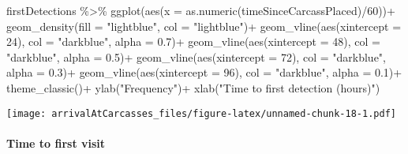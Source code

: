 \documentclass[
]{article}
\newenvironment{Shaded}{\begin{snugshade}}{\end{snugshade}}
\newcommand{\AttributeTok}[1]{\textcolor[rgb]{0.77,0.63,0.00}{#1}}
\newcommand{\DecValTok}[1]{\textcolor[rgb]{0.00,0.00,0.81}{#1}}
\newcommand{\FloatTok}[1]{\textcolor[rgb]{0.00,0.00,0.81}{#1}}
\newcommand{\FunctionTok}[1]{\textcolor[rgb]{0.00,0.00,0.00}{#1}}
\newcommand{\NormalTok}[1]{#1}
\newcommand{\SpecialCharTok}[1]{\textcolor[rgb]{0.00,0.00,0.00}{#1}}
\newcommand{\StringTok}[1]{\textcolor[rgb]{0.31,0.60,0.02}{#1}}
\begin{document}
\begin{Shaded}
\begin{Highlighting}[]
\NormalTok{firstDetections }\SpecialCharTok{\%\textgreater{}\%}
  \FunctionTok{ggplot}\NormalTok{(}\FunctionTok{aes}\NormalTok{(}\AttributeTok{x =} \FunctionTok{as.numeric}\NormalTok{(timeSinceCarcassPlaced)}\SpecialCharTok{/}\DecValTok{60}\NormalTok{))}\SpecialCharTok{+}
  \FunctionTok{geom\_density}\NormalTok{(}\AttributeTok{fill =} \StringTok{"lightblue"}\NormalTok{, }\AttributeTok{col =} \StringTok{"lightblue"}\NormalTok{)}\SpecialCharTok{+}
  \FunctionTok{geom\_vline}\NormalTok{(}\FunctionTok{aes}\NormalTok{(}\AttributeTok{xintercept =} \DecValTok{24}\NormalTok{), }\AttributeTok{col =} \StringTok{"darkblue"}\NormalTok{, }\AttributeTok{alpha =} \FloatTok{0.7}\NormalTok{)}\SpecialCharTok{+}
  \FunctionTok{geom\_vline}\NormalTok{(}\FunctionTok{aes}\NormalTok{(}\AttributeTok{xintercept =} \DecValTok{48}\NormalTok{), }\AttributeTok{col =} \StringTok{"darkblue"}\NormalTok{, }\AttributeTok{alpha =} \FloatTok{0.5}\NormalTok{)}\SpecialCharTok{+}
  \FunctionTok{geom\_vline}\NormalTok{(}\FunctionTok{aes}\NormalTok{(}\AttributeTok{xintercept =} \DecValTok{72}\NormalTok{), }\AttributeTok{col =} \StringTok{"darkblue"}\NormalTok{, }\AttributeTok{alpha =} \FloatTok{0.3}\NormalTok{)}\SpecialCharTok{+}
  \FunctionTok{geom\_vline}\NormalTok{(}\FunctionTok{aes}\NormalTok{(}\AttributeTok{xintercept =} \DecValTok{96}\NormalTok{), }\AttributeTok{col =} \StringTok{"darkblue"}\NormalTok{, }\AttributeTok{alpha =} \FloatTok{0.1}\NormalTok{)}\SpecialCharTok{+}
  \FunctionTok{theme\_classic}\NormalTok{()}\SpecialCharTok{+}
  \FunctionTok{ylab}\NormalTok{(}\StringTok{"Frequency"}\NormalTok{)}\SpecialCharTok{+}
  \FunctionTok{xlab}\NormalTok{(}\StringTok{"Time to first detection (hours)"}\NormalTok{)}
\end{Highlighting}
\end{Shaded}

\texttt{[image: arrivalAtCarcasses\_files/figure-latex/unnamed-chunk-18-1.pdf]}

\hypertarget{time-to-first-visit}{%
\paragraph{Time to first visit}\label{time-to-first-visit}}
\end{document}
